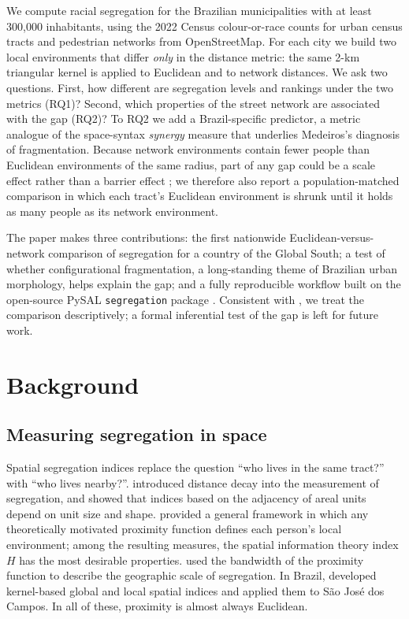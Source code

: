 We compute racial segregation for the \nCities{} Brazilian municipalities with at least 300,000 inhabitants,
using the 2022 Census colour-or-race counts for urban census tracts and pedestrian networks from OpenStreetMap.
For each city we build two local environments that differ \emph{only} in the distance metric: the same 2-km
triangular kernel is applied to Euclidean and to network distances. We ask two questions. First, how different
are segregation levels and rankings under the two metrics (RQ1)? Second, which properties of the street network
are associated with the gap (RQ2)? To RQ2 we add a Brazil-specific predictor, a metric analogue of the
space-syntax \emph{synergy} measure that underlies Medeiros's diagnosis of fragmentation. Because network
environments contain fewer people than Euclidean environments of the same radius, part of any gap could be a
scale effect rather than a barrier effect \citep{saporito2026reconsidering}; we therefore also report a
population-matched comparison in which each tract's Euclidean environment is shrunk until it holds as many
people as its network environment.

The paper makes three contributions: the first nationwide Euclidean-versus-network comparison of segregation for
a country of the Global South; a test of whether configurational fragmentation, a long-standing theme of
Brazilian urban morphology, helps explain the gap; and a fully reproducible workflow built on the open-source
PySAL \texttt{segregation} package \citep{cortes2026segregation,cortes2020open,rey2021comparative,rey2022pysal}.
Consistent with \citet{knaap2024segregated}, we treat the comparison descriptively; a formal inferential test of
the gap is left for future work.

\section{Background}\label{sec:background}

\subsection{Measuring segregation in space}

Spatial segregation indices replace the question ``who lives in the same tract?'' with ``who lives nearby?''.
\citet{white1983measurement} introduced distance decay into the measurement of segregation, and
\citet{wong1993spatial} showed that indices based on the adjacency of areal units depend on unit size and shape.
\citet{reardon2004measures} provided a general framework in which any theoretically motivated proximity function
defines each person's local environment; among the resulting measures, the spatial information theory index $H$
has the most desirable properties. \citet{reardon2008geographic} used the bandwidth of the proximity function to
describe the geographic scale of segregation. In Brazil, \citet{feitosa2007global} developed kernel-based global
and local spatial indices and applied them to S\~ao Jos\'e dos Campos. In all of these, proximity is almost always
Euclidean.

